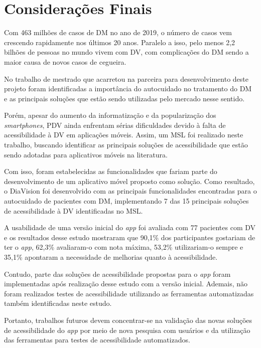 \chapter{Considerações Finais}
\label{ch:conclusion}

Com 463 milhões de casos de DM no ano de 2019, o número de casos vem crescendo rapidamente nos últimos 20 anos.
Paralelo a isso, pelo menos 2,2 bilhões de pessoas no mundo vivem com DV\@, com complicações do DM sendo
a maior causa de novos casos de cegueira.

No trabalho de mestrado que acarretou na parceira para desenvolvimento deste projeto foram identificadas a importância
do autocuidado no tratamento do DM e as principais soluções que estão sendo utilizadas pelo mercado nesse sentido.

Porém, apesar do aumento da informatização e da popularização dos \emph{smartphones},
PDV ainda enfrentam sérias dificuldades devido à falta de acessibilidade à DV em aplicações móveis. Assim, um MSL foi realizado
neste trabalho, buscando identificar as principais soluções de acessibilidade que estão sendo adotadas para
aplicativos móveis na literatura. 

Com isso, foram estabelecidas as funcionalidades que fariam parte do desenvolvimento de um aplicativo
móvel proposto como solução. Como resultado, o DiaVision foi desenvolvido com as principais
funcionalidades encontradas para o autocuidado de pacientes com DM, implementando 7 das 15 principais soluções
de acessibilidade à DV identificadas no MSL\@.

A usabilidade de uma versão inicial do \emph{app} foi avaliada com 77 pacientes com DV e os resultados
desse estudo mostraram que 90,1\% dos participantes gostariam de ter o \emph{app}, 62,3\% avaliaram-o com nota
máxima, 53,2\% utilizariam-o sempre e 35,1\% apontaram a necessidade de melhorias quanto à acessibilidade.

Contudo, parte das soluções de acessibilidade propostas para o \emph{app} foram implementadas após realização
desse estudo com a versão inicial. Ademais, não foram realizados testes de acessibilidade utilizando
as ferramentas automatizadas também identificadas neste estudo.

Portanto, trabalhos futuros devem concentrar-se na validação das novas soluções de acessibilidade do \emph{app}
por meio de nova pesquisa com usuários e da utilização das ferramentas para testes de acessibilidade automatizados.